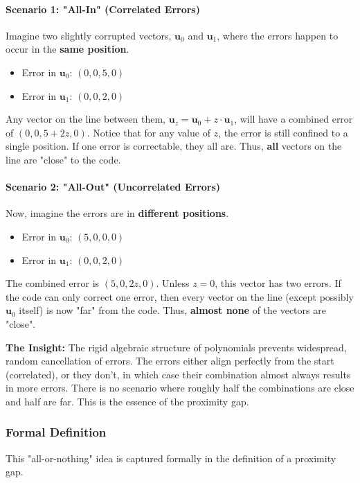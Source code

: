 \documentclass{article}
\begin{document}
\begin{tcolorbox}[breakable, title={Analogy: The Proximity Gap}]
\paragraph{Scenario 1: "All-In" (Correlated Errors)}
Imagine two slightly corrupted vectors, $\mathbf{u}_0$ and $\mathbf{u}_1$, where the errors happen to occur in the \textbf{same position}.
\begin{itemize}
    \item Error in $\mathbf{u}_0$: $(0, 0, 5, 0)$
    \item Error in $\mathbf{u}_1$: $(0, 0, 2, 0)$
\end{itemize}
Any vector on the line between them, $\mathbf{u}_z = \mathbf{u}_0 + z \cdot \mathbf{u}_1$, will have a combined error of $(0, 0, 5+2z, 0)$. Notice that for any value of $z$, the error is still confined to a single position. If one error is correctable, they all are. Thus, \textbf{all} vectors on the line are "close" to the code.

\hrulefill

\paragraph{Scenario 2: "All-Out" (Uncorrelated Errors)}
Now, imagine the errors are in \textbf{different positions}.
\begin{itemize}
    \item Error in $\mathbf{u}_0$: $(5, 0, 0, 0)$
    \item Error in $\mathbf{u}_1$: $(0, 0, 2, 0)$
\end{itemize}
The combined error is $(5, 0, 2z, 0)$. Unless $z=0$, this vector has two errors. If the code can only correct one error, then every vector on the line (except possibly $\mathbf{u}_0$ itself) is now "far" from the code. Thus, \textbf{almost none} of the vectors are "close".

\textbf{The Insight:} The rigid algebraic structure of polynomials prevents widespread, random cancellation of errors. The errors either align perfectly from the start (correlated), or they don't, in which case their combination almost always results in more errors. There is no scenario where roughly half the combinations are close and half are far. This is the essence of the proximity gap.
\end{tcolorbox}

\subsubsection{Formal Definition}
This "all-or-nothing" idea is captured formally in the definition of a proximity gap. 
\end{document}
